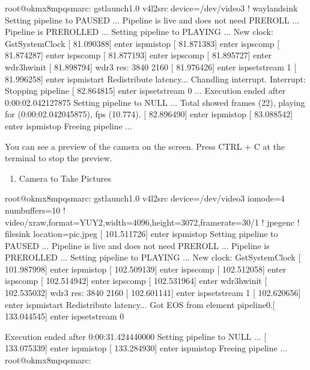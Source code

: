 \documentclass[letterpaper,10pt,openany,english]{sphinxmanual}
\begin{document}
\begin{sphinxVerbatim}[commandchars=\\\{\}]
root@ok\PYGZhy{}mx8mpq\PYGZhy{}smarc:\PYGZti{}\PYGZsh{} gst\PYGZhy{}launch\PYGZhy{}1.0 v4l2src device=/dev/video3 ! waylandsink
Setting pipeline to PAUSED ...
Pipeline is live and does not need PREROLL ...
Pipeline is PREROLLED ...
Setting pipeline to PLAYING ...
New clock: GstSystemClock
[   81.090388] enter isp\PYGZus{}mi\PYGZus{}stop
[   81.871383] enter isp\PYGZus{}s\PYGZus{}comp
[   81.874287] enter isp\PYGZus{}s\PYGZus{}comp
[   81.877193] enter isp\PYGZus{}s\PYGZus{}comp
[   81.895727] enter wdr3\PYGZus{}hw\PYGZus{}init
[   81.898794] wdr3 res: 3840 2160 
[   81.976426] enter isp\PYGZus{}set\PYGZus{}stream 1
[   81.996258] enter isp\PYGZus{}mi\PYGZus{}start
Redistribute latency...
\PYGZca{}Chandling interrupt.
Interrupt: Stopping pipeline [   82.864815] enter isp\PYGZus{}set\PYGZus{}stream 0
...
Execution ended after 0:00:02.042127875
Setting pipeline to NULL ...
Total showed frames (22), playing for (0:00:02.042045875), fps (10.774).
[   82.896490] enter isp\PYGZus{}mi\PYGZus{}stop
[   83.088542] enter isp\PYGZus{}mi\PYGZus{}stop
Freeing pipeline ...
\end{sphinxVerbatim}

\sphinxAtStartPar
You can see a preview of the camera on the screen. Press CTRL + C at the terminal to stop the preview.
\begin{enumerate}
%
\setcounter{enumi}{2}
\item {} 
\sphinxAtStartPar
Camera to Take Pictures

\end{enumerate}

\begin{sphinxVerbatim}[commandchars=\\\{\}]
root@ok\PYGZhy{}mx8mpq\PYGZhy{}smarc:\PYGZti{}\PYGZsh{} gst\PYGZhy{}launch\PYGZhy{}1.0 v4l2src device=/dev/video3 io\PYGZhy{}mode=4 num\PYGZhy{}buffers=10 ! video/x\PYGZhy{}raw,format=YUY2,width=4096,height=3072,framerate=30/1 ! jpegenc ! filesink location=pic.jpeg
[  101.511726] enter isp\PYGZus{}mi\PYGZus{}stop
Setting pipeline to PAUSED ...
Pipeline is live and does not need PREROLL ...
Pipeline is PREROLLED ...
Setting pipeline to PLAYING ...
New clock: GstSystemClock
[  101.987998] enter isp\PYGZus{}mi\PYGZus{}stop
[  102.509139] enter isp\PYGZus{}s\PYGZus{}comp
[  102.512058] enter isp\PYGZus{}s\PYGZus{}comp
[  102.514942] enter isp\PYGZus{}s\PYGZus{}comp
[  102.531964] enter wdr3\PYGZus{}hw\PYGZus{}init
[  102.535032] wdr3 res: 3840 2160 
[  102.601141] enter isp\PYGZus{}set\PYGZus{}stream 1
[  102.620656] enter isp\PYGZus{}mi\PYGZus{}start
Redistribute latency...
Got EOS from element \PYGZdq{}pipeline0\PYGZdq{}.[  133.044545] enter isp\PYGZus{}set\PYGZus{}stream 0

Execution ended after 0:00:31.424440000
Setting pipeline to NULL ...
[  133.075339] enter isp\PYGZus{}mi\PYGZus{}stop
[  133.284930] enter isp\PYGZus{}mi\PYGZus{}stop
Freeing pipeline ...
root@ok\PYGZhy{}mx8mpq\PYGZhy{}smarc:\PYGZti{}\PYGZsh{}
\end{sphinxVerbatim}
\end{document}
